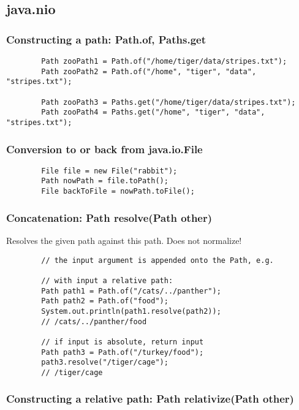 \documentclass{scrartcl}
\begin{document}
\subsection{java.nio}

\subsubsection{Constructing a path: Path.of, Paths.get}

    \begin{lstlisting}
        Path zooPath1 = Path.of("/home/tiger/data/stripes.txt");
        Path zooPath2 = Path.of("/home", "tiger", "data", "stripes.txt");

        Path zooPath3 = Paths.get("/home/tiger/data/stripes.txt");
        Path zooPath4 = Paths.get("/home", "tiger", "data", "stripes.txt");
    \end{lstlisting}

\subsubsection{Conversion to or back from java.io.File}

    \begin{lstlisting}
        File file = new File("rabbit");
        Path nowPath = file.toPath();
        File backToFile = nowPath.toFile();
    \end{lstlisting}

\subsubsection{Concatenation: Path resolve(Path other)}

    Resolves the given path against this path. Does not normalize!

    \begin{lstlisting}
        // the input argument is appended onto the Path, e.g.

        // with input a relative path:
        Path path1 = Path.of("/cats/../panther");
        Path path2 = Path.of("food");
        System.out.println(path1.resolve(path2));
        // /cats/../panther/food

        // if input is absolute, return input
        Path path3 = Path.of("/turkey/food");
        path3.resolve("/tiger/cage");
        // /tiger/cage
    \end{lstlisting}

\subsubsection{Constructing a relative path: Path relativize(Path other)}
\end{document}
